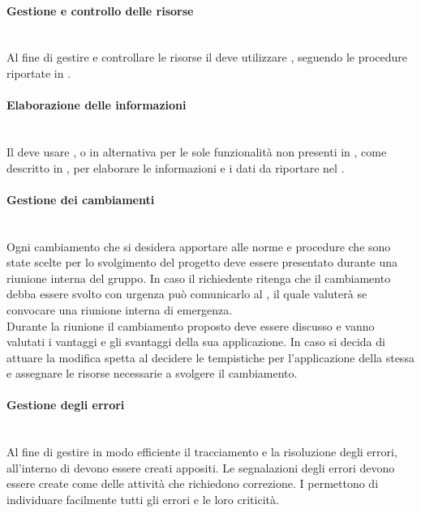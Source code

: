\paragraph{Gestione e controllo delle risorse}\mbox{}\\
Al fine di gestire e controllare le risorse il \Responsabile{} deve utilizzare , seguendo le procedure riportate in .

\paragraph{Elaborazione delle informazioni}\mbox{}\\
Il \Responsabile{} deve usare , o in alternativa  per le sole funzionalità non presenti in , come descritto in , per elaborare le informazioni e i dati da riportare nel \PianoDiProgetto.

\paragraph{Gestione dei cambiamenti}\mbox{}\\
Ogni cambiamento che si desidera apportare alle norme e procedure che sono state scelte per lo svolgimento del progetto deve essere presentato durante una riunione interna del gruppo. In caso il richiedente ritenga che il cambiamento debba essere svolto con urgenza può comunicarlo al \Responsabile{}, il quale valuterà se convocare una riunione interna di emergenza.
\\Durante la riunione il cambiamento proposto deve essere discusso e vanno valutati i vantaggi e gli svantaggi della sua applicazione. In caso si decida di attuare la modifica spetta al \Responsabile{} decidere le tempistiche per l'applicazione della stessa e assegnare le risorse necessarie a svolgere il cambiamento.

\paragraph{Gestione degli errori} \mbox{} \\
Al fine di gestire in modo efficiente il tracciamento e la risoluzione degli errori, all'interno di  devono essere creati  appositi.
Le segnalazioni degli errori devono essere create come  delle attività che richiedono correzione. I  permettono di individuare facilmente tutti gli errori e le loro criticità.\\

